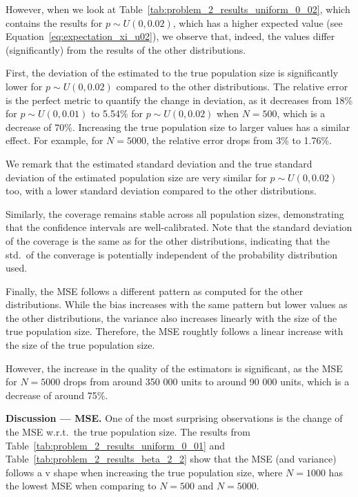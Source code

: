 \documentclass{article}
\begin{document}
However, when we look at Table~\ref{tab:problem_2_results_uniform_0_02}, which contains the results for $p\sim U(0, 0.02)$, which has a higher expected value (see Equation~\ref{eq:expectation_xi_u02}), we observe that, indeed, the values differ (significantly) from the results of the other distributions.

First, the deviation of the estimated to the true population size is significantly lower for $p\sim U(0, 0.02)$ compared to the other distributions. 
The relative error is the perfect metric to quantify the change in deviation, as it decreases from 18\% for $p\sim U(0, 0.01)$ to 5.54\% for $p\sim U(0, 0.02)$ when $N=500$, which is a decrease of $70\%$. Increasing the true population size to larger values has a similar effect. For example, for $N=5000$, the relative error drops from 3\% to 1.76\%.

We remark that the estimated standard deviation and the true standard deviation of the estimated population size are very similar for $p\sim U(0, 0.02)$ too, with a lower standard deviation compared to the other distributions.

Similarly, the coverage remains stable across all population sizes, demonstrating that the confidence intervals are well-calibrated. Note that the standard deviation of the coverage is the same as for the other distributions, indicating that the std.\ of the converage is potentially independent of the probability distribution used.

Finally, the MSE follows a different pattern as computed for the other distributions.
While the bias increases with the same pattern but lower values as the other distributions, the variance also increases linearly with the size of the true population size. 
Therefore, the MSE roughtly follows a linear increase with the size of the true population size.

However, the increase in the quality of the estimators is significant, as the MSE for $N=5000$ drops from around 350 000 units to around 90 000 units, which is a decrease of around 75\%.


\textbf{Discussion --- MSE.}
One of the most surprising observations is the change of the MSE w.r.t.\ the true population size. The results from Table~\ref{tab:problem_2_results_uniform_0_01} and Table~\ref{tab:problem_2_results_beta_2_2} show that the MSE (and variance) follows a v shape when increasing the true population size, where $N=1000$ has the lowest MSE when comparing to $N=500$ and $N=5000$.
\end{document}
